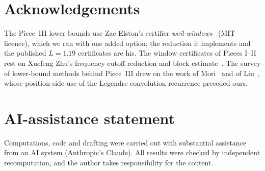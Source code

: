 \documentclass[11pt]{amsart}
\theoremstyle{definition}
\theoremstyle{remark}
\numberwithin{equation}{section}
\begin{document}
\section*{Acknowledgements}
The Piece~III lower bounds use Zac Elston's certifier \emph{weil-windows}~\cite{Elston} (MIT licence), which we ran with one added option; the reduction it implements and the published $L=1.19$ certificates are his. The window certificates of Pieces I--II rest on Xuefeng Zhu's frequency-cutoff reduction and block estimate~\cite{Zhu}. The survey of lower-bound methods behind Piece~III drew on the work of Mori~\cite{Mori} and of Liu~\cite{Liu}, whose position-side use of the Legendre convolution recurrence preceded ours.

\section*{AI-assistance statement}
Computations, code and drafting were carried out with substantial assistance from an AI system (Anthropic's Claude). All results were checked by independent recomputation, and the author takes responsibility for the content.



\end{document}
